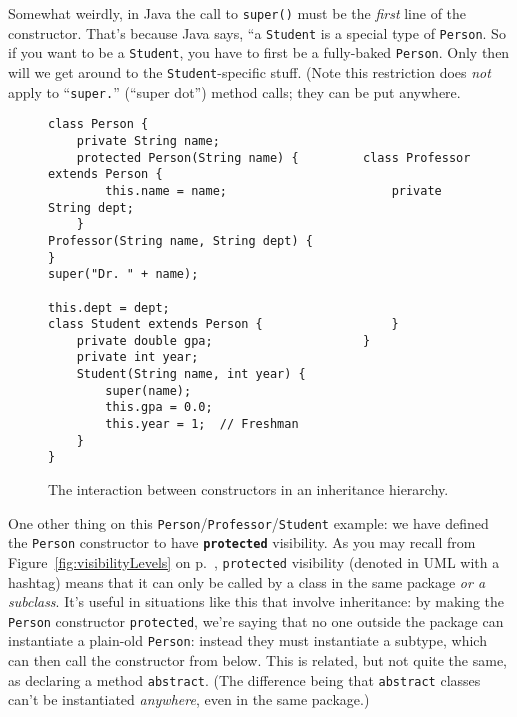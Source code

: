 Somewhat weirdly, in Java the call to \texttt{super()} must be the
\textit{first} line of the constructor. That's because Java says, ``a
\texttt{Student} is a special type of \texttt{Person}. So if you want to be a
\texttt{Student}, you have to first be a fully-baked \texttt{Person}. Only
then will we get around to the \texttt{Student}-specific stuff. (Note this
restriction does \textit{not} apply to ``\texttt{super.}'' (``super dot'')
method calls; they can be put anywhere.

\begin{figure}[ht]
\begin{Verbatim}[fontsize=\scriptsize,samepage=true,frame=single]
class Person {                    
    private String name;          
    protected Person(String name) {         class Professor extends Person {
        this.name = name;                       private String dept;
    }                                           Professor(String name, String dept) {
}                                                   super("Dr. " + name);
                                                    this.dept = dept;
class Student extends Person {                  }
    private double gpa;                     }
    private int year;
    Student(String name, int year) {
        super(name);
        this.gpa = 0.0;
        this.year = 1;  // Freshman
    }
}
\end{Verbatim}
\caption{The interaction between constructors in an inheritance hierarchy.}
\label{fig:inhConstrClass}
\end{figure}

One other thing on this \texttt{Person}/\texttt{Professor}/\texttt{Student}
example: we have defined the \texttt{Person} constructor to have
\textbf{\texttt{protected}} visibility. As you may recall from
Figure~\ref{fig:visibilityLevels} on p.~\pageref{fig:visibilityLevels},
\texttt{protected} visibility (denoted in UML with a hashtag) means that it
can only be called by a class in the same package \textit{or a subclass}. It's
useful in situations like this that involve inheritance: by making the
\texttt{Person} constructor \texttt{protected}, we're saying that no one
outside the package can instantiate a plain-old \texttt{Person}: instead they
must instantiate a subtype, which can then call the constructor from below.
This is related, but not quite the same, as declaring a method
\texttt{abstract}. (The difference being that \texttt{abstract} classes can't
be instantiated \textit{anywhere}, even in the same package.)

